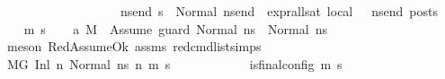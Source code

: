 \begin{isabellebody}
\ \ \ \ \ \ \ \ \ \ \ \ \ \ \ \ \ \ \ {\isacharparenleft}{\kern0pt}{\isasymforall}ns{\isacharunderscore}{\kern0pt}end{\isachardot}{\kern0pt}\ s\ {\isacharequal}{\kern0pt}\ Normal\ ns{\isacharunderscore}{\kern0pt}end\ {\isasymlongrightarrow}\ {\isacharparenleft}{\kern0pt}expr{\isacharunderscore}{\kern0pt}all{\isacharunderscore}{\kern0pt}sat\ {\isasymLambda}{}{\isacharunderscore}{\kern0pt}local\ {\isasymGamma}\ {\isasymOmega}\ ns{\isacharunderscore}{\kern0pt}end{\isacharparenright}{\kern0pt}\ posts{\isacharparenright}{\kern0pt}{\isacharparenright}{\kern0pt}{\isachardoublequoteclose}\isanewline
%
\isadelimproof
%
\endisadelimproof
%
\isatagproof
{}\isamarkupfalse%
\ {\isacharminus}{\kern0pt}\isanewline
\ \ \isamarkupfalse%
\ m{}\ s{}\isanewline
\ \ \isamarkupfalse%
\ a{}{\isacharcolon}{\kern0pt}\ {\isachardoublequoteopen}{\isacharparenleft}{\kern0pt}M{\isacharcomma}{\kern0pt}{\isasymLambda}{\isacharcomma}{\kern0pt}{\isasymGamma}{\isacharcomma}{\kern0pt}{\isasymOmega}\ {\isasymturnstile}\ {\isasymlangle}{\isacharbrackleft}{\kern0pt}Assume\ guard{\isacharbrackright}{\kern0pt}{\isacharcomma}{\kern0pt}\ Normal\ ns{}{\isasymrangle}\ {\isacharbrackleft}{\kern0pt}{\isasymrightarrow}{\isacharbrackright}{\kern0pt}\ {\isacharparenleft}{\kern0pt}Normal\ ns{}{\isacharparenright}{\kern0pt}{\isacharparenright}{\kern0pt}{\isachardoublequoteclose}\ \isanewline
\ \ \ \ \isamarkupfalse%
\ {\isacharparenleft}{\kern0pt}meson\ RedAssumeOk\ assms{\isacharparenleft}{\kern0pt}{}{\isacharparenright}{\kern0pt}\ red{\isacharunderscore}{\kern0pt}cmd{\isacharunderscore}{\kern0pt}list{\isachardot}{\kern0pt}simps{\isacharparenright}{\kern0pt}\isanewline
\ \ \isamarkupfalse%
\ {\isachardoublequoteopen}{\isacharparenleft}{\kern0pt}M{\isacharcomma}{\kern0pt}{\isasymLambda}{\isacharcomma}{\kern0pt}{\isasymGamma}{\isacharcomma}{\kern0pt}{\isasymOmega}{\isacharcomma}{\kern0pt}G\ {\isasymturnstile}{\isacharparenleft}{\kern0pt}Inl\ n{}{\isacharcomma}{\kern0pt}\ Normal\ ns{}{\isacharparenright}{\kern0pt}\ {\isacharminus}{\kern0pt}n{\isasymrightarrow}{\isacharasterisk}{\kern0pt}\ {\isacharparenleft}{\kern0pt}m{}{\isacharcomma}{\kern0pt}\ s{}{\isacharparenright}{\kern0pt}{\isacharparenright}{\kern0pt}\ {\isasymLongrightarrow}\ \isanewline
\ \ \ \ \ \ \ \ \ \ {\isacharparenleft}{\kern0pt}is{\isacharunderscore}{\kern0pt}final{\isacharunderscore}{\kern0pt}config\ {\isacharparenleft}{\kern0pt}m{}{\isacharcomma}{\kern0pt}\ s{}{\isacharparenright}{\kern0pt}\ {\isasymLongrightarrow}\ \isanewline

\end{isabellebody}
